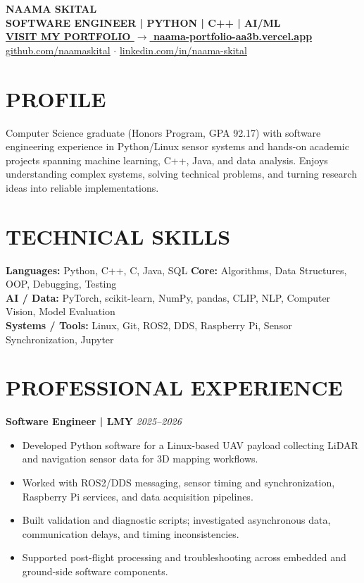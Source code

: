 \documentclass[10pt,a4paper]{article}
\begin{document}
\linespread{0.96}\selectfont
\begin{center}
{\fontsize{23}{26}\selectfont\bfseries\color{navy} NAAMA SKITAL}\\[3pt]
{\color{purple}\bfseries SOFTWARE ENGINEER \quad | \quad PYTHON \quad | \quad C++ \quad | \quad AI/ML}\\[5pt]
{\fontsize{13}{16}\selectfont\bfseries\color{portfolioBlue}\href{https://naama-portfolio-aa3b.vercel.app/}{VISIT MY PORTFOLIO  $\longrightarrow$  naama-portfolio-aa3b.vercel.app}}\\[4pt]
\href{https://github.com/naamaskital}{github.com/naamaskital} \quad $\cdot$ \quad \href{https://www.linkedin.com/in/naama-skital/}{linkedin.com/in/naama-skital}
\end{center}
\section*{PROFILE}
Computer Science graduate (Honors Program, GPA 92.17) with software engineering experience in Python/Linux sensor systems and hands-on academic projects spanning machine learning, C++, Java, and data analysis. Enjoys understanding complex systems, solving technical problems, and turning research ideas into reliable implementations.
\section*{TECHNICAL SKILLS}
\textbf{Languages:} Python, C++, C, Java, SQL \quad \textbf{Core:} Algorithms, Data Structures, OOP, Debugging, Testing\\
\textbf{AI / Data:} PyTorch, scikit-learn, NumPy, pandas, CLIP, NLP, Computer Vision, Model Evaluation\\
\textbf{Systems / Tools:} Linux, Git, ROS2, DDS, Raspberry Pi, Sensor Synchronization, Jupyter
\section*{PROFESSIONAL EXPERIENCE}
\textbf{Software Engineer \quad | \quad LMY} \hfill \textit{2025--2026}
\begin{itemize}
\item Developed Python software for a Linux-based UAV payload collecting LiDAR and navigation sensor data for 3D mapping workflows.
\item Worked with ROS2/DDS messaging, sensor timing and synchronization, Raspberry Pi services, and data acquisition pipelines.
\item Built validation and diagnostic scripts; investigated asynchronous data, communication delays, and timing inconsistencies.
\item Supported post-flight processing and troubleshooting across embedded and ground-side software components.
\end{itemize}
\end{document}
